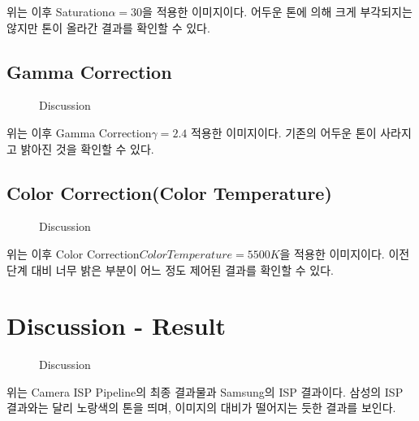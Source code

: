 \documentclass{report}
\begin{document}
위는 이후 Saturation\(\alpha = 30\)을 적용한 이미지이다.
어두운 톤에 의해 크게 부각되지는 않지만 톤이 올라간 결과를 확인할 수 있다.

\subsection*{Gamma Correction}

\begin{figure}[htbp]
    \centering


    \caption{Discussion}
\end{figure}

위는 이후 Gamma Correction\(\gamma = 2.4\) 적용한 이미지이다.
기존의 어두운 톤이 사라지고 밝아진 것을 확인할 수 있다.

\subsection*{Color Correction(Color Temperature)}

\begin{figure}[htbp]
    \centering


    \caption{Discussion}
\end{figure}

위는 이후 Color Correction\(Color Temperature = 5500K\)을 적용한 이미지이다.
이전 단계 대비 너무 밝은 부분이 어느 정도 제어된 결과를 확인할 수 있다.

\section*{Discussion - Result}

\begin{figure}[htbp]
    \centering

    \hspace{1pt}

    \caption{Discussion}
\end{figure}

위는 Camera ISP Pipeline의 최종 결과물과 Samsung의 ISP 결과이다.
삼성의 ISP 결과와는 달리 노랑색의 톤을 띄며, 이미지의 대비가 떨어지는 듯한 결과를 보인다.
\end{document}
